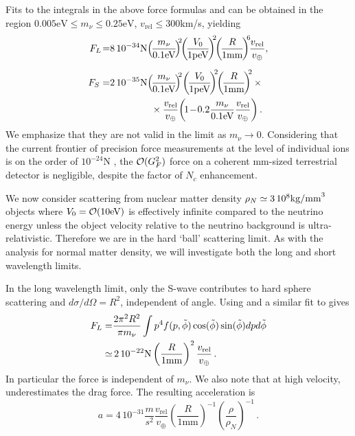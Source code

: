 Fits to the integrals in the above force formulas  and  can be obtained in the region $0.005 \text{eV}\leq m_\nu\leq 0.25\text{eV}$, $v_\text{rel}\leq 300$km/s, yielding
\begin{align}\label{FL}
F_L\!=&8\,10^{-34}{\rm N}\!\left(\!\frac{m_\nu}{0.1 \text{eV}}\!\right)^{\!\!2}\!\! \left(\!\frac{V_0}{1\text{peV}}\!\right)^{\!\!2}\!\!\left(\!\frac{R}{1\text{mm}}\!\right)^{\!\! 6} \!\!\frac{v_{\text{rel}}}{v_\oplus},\\[0.2cm]
F_S=&2\, 10^{-35}{\rm N}\!\left(\!\frac{m_\nu}{0.1\text{eV}}\!\right)^{\!\!2}\! \left(\!\frac{V_0}{1\text{peV}}\!\right)^{\!\!2}\!\!\left(\!\frac{R}{1\text{mm}}\!\right)^{\!\!2}\times\notag \\
&\hspace*{1.5cm}\times\frac{v_{\text{rel}}}{v_\oplus}\!\left(\!1\!-\!0.2\frac{m_\nu}{0.1\text{eV}}\frac{v_{\text{rel}}}{v_\oplus}\right).
\end{align}
We emphasize that they are not valid in the limit as $m_\nu\rightarrow 0$. Considering that the current frontier of precision force measurements at the level of individual ions is on the order of $10^{-24}$N \cite{Biercuk}, the ${\cal O}(G_F^2)$ force on a coherent mm-sized terrestrial detector is negligible, despite the factor of $N_c$ enhancement. 

We now consider scattering from nuclear matter density $\rho_N\simeq 3 \, 10^{8}{\rm kg/mm}^3$ objects where $V_0={\cal O}(10\text{eV})$ is effectively infinite compared to the neutrino energy unless the object velocity relative to the neutrino background is ultra-relativistic.  Therefore we are in the hard `ball' scattering limit. As with the analysis for normal matter density, we will investigate both the long and short wavelength limits. 

In the long wavelength limit, only the S-wave contributes to hard sphere scattering and $d\sigma/d\Omega=R^2$, independent of angle. Using  and a similar fit to  gives
\begin{align}\label{FLHard}
F_L=&\frac{2\pi^2R^2}{\pi m_\nu} \int p^4 f(p,\tilde\phi) \cos(\tilde\phi) \sin(\tilde\phi) dpd\tilde\phi\notag\\
\simeq &\, 2\, 10^{-22}{\rm N}\left(\frac{R}{1\text{mm}}\right)^2\frac{v_{\text{rel}}}{v_\oplus}\,.
\end{align}
In particular the force is independent of $m_\nu$.  We also note that at high velocity,   underestimates the drag force. The resulting acceleration is
\begin{equation}
a=4\, 10^{-31}\frac{m}{s^2}\frac{v_{\text{rel}} }{v_\oplus}\! \left(\frac{R}{1\text{mm}}\right)^{-1}\!\!\left(\frac{\rho}{\rho_N}\right)^{-1}\,.\!\!
\end{equation}

